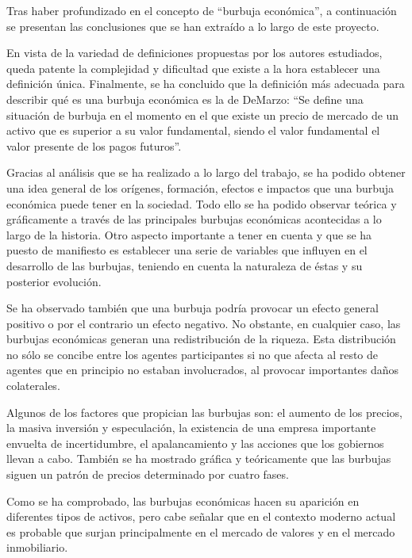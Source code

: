 Tras haber profundizado en el concepto de “burbuja económica”, a continuación se presentan las conclusiones que se han extraído a lo largo de este proyecto. 

En vista de la variedad de definiciones propuestas por los autores estudiados, queda patente la complejidad y dificultad que existe a la hora establecer una definición única. Finalmente, se ha concluido que la definición más adecuada para describir qué es una burbuja económica es la de DeMarzo: “Se define una situación de burbuja en el momento en el que existe un precio de mercado de un activo que es superior a su valor fundamental, siendo el valor fundamental el valor presente de los pagos futuros”.

Gracias al análisis que se ha realizado a lo largo del trabajo, se ha podido obtener una idea general de los orígenes, formación, efectos e impactos que una burbuja económica puede tener en la sociedad. Todo ello se ha podido observar teórica y gráficamente a través de las principales burbujas económicas acontecidas a lo largo de la historia. Otro aspecto importante a tener en cuenta y que se ha puesto de manifiesto es establecer una serie de variables que influyen en el desarrollo de las burbujas, teniendo en cuenta la naturaleza de éstas y su posterior evolución.

Se ha observado también que una burbuja podría provocar un efecto general positivo o por el contrario un efecto negativo. No obstante, en cualquier caso, las burbujas económicas generan una redistribución de la riqueza. Esta distribución no sólo se concibe entre los agentes participantes si no que afecta al resto de agentes que en principio no estaban involucrados, al provocar importantes daños colaterales.

Algunos de los factores que propician las burbujas son: el aumento de los precios, la masiva inversión y especulación, la existencia de una empresa importante envuelta de incertidumbre, el apalancamiento y las acciones que los gobiernos llevan a cabo. También se ha mostrado gráfica y teóricamente que las burbujas siguen un patrón de precios determinado por cuatro fases.

Como se ha comprobado, las burbujas económicas hacen su aparición en diferentes tipos de activos, pero cabe señalar que en el contexto moderno actual es probable que surjan principalmente en el mercado de valores y en el mercado inmobiliario.

